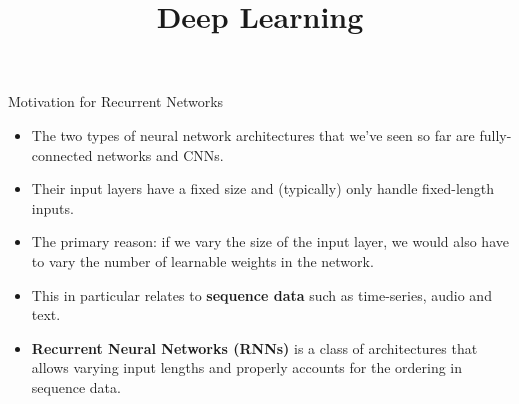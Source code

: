 






\newcommand{\titlefigure}{figure/rnn_sample_z5.png}
\newcommand{\learninggoals}{
  \item Why do we need them?
  \item How do they work?
  \item Computational Graph o Recurrent Networks
}

\title{Deep Learning}
\date{}







\begin{frame} {Motivation for Recurrent Networks}
  \begin{itemize}
    \item The two types of neural network architectures that we've seen so far are fully-connected networks and CNNs.
    \item Their input layers have a fixed size and (typically) only handle fixed-length inputs.
    \item The primary reason: if we vary the size of the input layer, we would also have to vary the number of learnable weights in the network.
    \item This in particular relates to \textbf{sequence data} such as time-series, audio and text.
    \item \textbf{Recurrent Neural Networks (RNNs)} is a class of architectures that allows varying input lengths and properly accounts for the ordering in sequence data.
  \end{itemize}
\end{frame}



 
